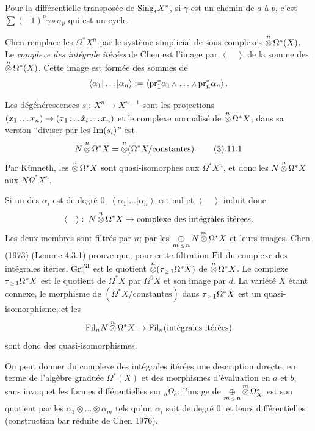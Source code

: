 Pour la diff\'erentielle transpos\'ee de
$\text{\rm Sing}_*X^*$, si $\gamma$ est un chemin de $a$
\`a $b$, c'est $\sum(-1)^p\gamma\circ\sigma_p$
qui est un cycle.

Chen remplace les $\Omega^*X^n$ par le
syst\`eme simplicial de sous-complexes
$\otimesop^{n}\Omega^*(X)$.
Le {\it complexe des int\'egrale it\'er\'ees}
de Chen est l'image par $\left<\quad\right>$
de la somme des $\otimesop^{n} \Omega^*(X)$.
Cette image est form\'ee des sommes de 
$$
\left<\alpha_1\vert\ldots\vert\alpha_n\right>:=
\left<\pr_1^*\alpha_1\w\ldots\w\pr_n^*\alpha_n
\right>.
$$

Les d\'eg\'en\'erescences $s_i\colon\, X^n\to
X^{n-1}$ sont les projections $(x_1\ldots
x_n)\to
(x_1\ldots\Hat{x}_i\ldots x_n)$ et le complexe
normalis\'e de $\otimesop^{n}\Omega^*X$, dans
sa version ``diviser par les $\text{\rm Im}(s_i)$'' est
$$
N\otimesop^{n}\Omega^*X=\otimesop^{n}(\Omega^*X/
\text{constantes}).\tag3.11.1
$$
Par K\"unneth, les $\otimesop^{n}\Omega^*X$
sont quasi-isomorphes aux $\Omega^*X^n$, et
donc les $N\otimesop^{n}\Omega^*X$ aux
$N\Omega^*X^n$.

Si un des $\alpha_i$ est de degr\'e $0$,
$\left<\alpha_1\vert\ldots\vert\alpha_n\right>$
est nul et $\left<\quad\right>$ induit donc
$$
\left<\quad\right>\colon\,
N\otimesop^{n}\Omega^*X\to\text{complexe des
int\'egrales it\'erees.}
$$
Les deux membres sont filtr\'es par $n$; par
les $\oplusop_{m\Le n}N\otimesop^{m}\Omega^*X$
et leurs images.
Chen (1973) (Lemme 4.3.1) prouve 
que, pour cette filtration $\text{\rm Fil}$ du complexe
des int\'egrales it\'eries, $\text{\rm Gr}_n^{\text{\rm Fil}}$ est
le quotient $\otimesop^{n}(\tau_{\Ge 1}\Omega^*X)$
de $\otimesop^{n}\Omega^*X$.
Le complexe $\tau_{\Ge 1}\Omega^*X$ est le
quotient de $\Omega^*X$ par $\Omega^0X$ et son
image par $d$.
La vari\'et\'e $X$ \'etant connexe, le
morphisme de $(\Omega^*X/\text{constantes})$
dans $\tau_{\Ge 1}\Omega^*X$ est un
quasi-isomorphisme, et les
$$
\Fil_nN\otimesop^{n}\Omega^*X
\to\Fil_n(\text{int\'egrales it\'er\'ees})
$$
sont donc des quasi-isomorphismes.

On peut donner du complexe des int\'egrales
it\'er\'ees une description directe, en terme
de l'alg\`ebre gradu\'ee $\Omega^*(X)$ et des
morphismes d'\'evaluation en $a$ et $b$, sans
invoquet
les formes diff\'erentielles sur
${}_b\Omega_a$: l'image de $\oplusop_{m\Le
n}\otimesop^{m}\Omega_X^*$ est son quotient par
les $\alpha_1\otimes\ldots\otimes\alpha_m$
tels qu'un $\alpha_i$ soit de degr\'e $0$, et
leurs diff\'erentielles (construction bar
r\'eduite de Chen 1976).
\endremark

